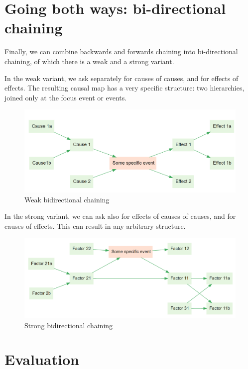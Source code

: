 \documentclass[
]{book}
\begin{document}
\hypertarget{going-both-ways-bi-directional-chaining}{%
\section{Going both ways: bi-directional chaining}\label{going-both-ways-bi-directional-chaining}}

Finally, we can combine backwards and forwards chaining into bi-directional chaining, of which there is a weak and a strong variant.

In the weak variant, we ask separately for causes of causes, and for effects of effects. The resulting causal map has a very specific structure: two hierarchies, joined only at the focus event or events.

\begin{figure}
\centering
\includegraphics[width=6.77083in,height=\textheight]{_assets/image-20210215094522576.png}
\caption{Weak bidirectional chaining}
\end{figure}

In the strong variant, we can ask also for effects of causes of causes, and for causes of effects. This can result in any arbitrary structure.

\begin{figure}
\centering
\includegraphics[width=6.77083in,height=\textheight]{_assets/image-20210215094737856.png}
\caption{Strong bidirectional chaining}
\end{figure}

\hypertarget{evaluation}{%
\section{Evaluation}\label{evaluation}}
\end{document}
